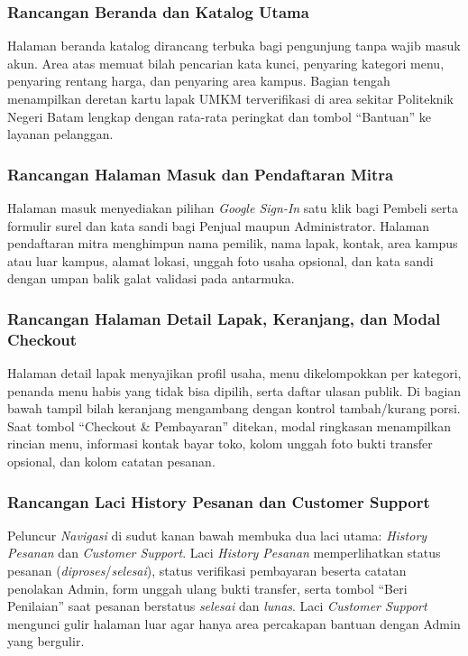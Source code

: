 \subsubsection{Rancangan Beranda dan Katalog Utama}
Halaman beranda katalog dirancang terbuka bagi pengunjung tanpa wajib masuk akun. Area atas memuat bilah pencarian kata kunci, penyaring kategori menu, penyaring rentang harga, dan penyaring area kampus. Bagian tengah menampilkan deretan kartu lapak UMKM terverifikasi di area sekitar Politeknik Negeri Batam lengkap dengan rata-rata peringkat dan tombol ``Bantuan'' ke layanan pelanggan.

\subsubsection{Rancangan Halaman Masuk dan Pendaftaran Mitra}
Halaman masuk menyediakan pilihan \textit{Google Sign-In} satu klik bagi Pembeli serta formulir surel dan kata sandi bagi Penjual maupun Administrator. Halaman pendaftaran mitra menghimpun nama pemilik, nama lapak, kontak, area kampus atau luar kampus, alamat lokasi, unggah foto usaha opsional, dan kata sandi dengan umpan balik galat validasi pada antarmuka.

\subsubsection{Rancangan Halaman Detail Lapak, Keranjang, dan Modal Checkout}
Halaman detail lapak menyajikan profil usaha, menu dikelompokkan per kategori, penanda menu habis yang tidak bisa dipilih, serta daftar ulasan publik. Di bagian bawah tampil bilah keranjang mengambang dengan kontrol tambah/kurang porsi. Saat tombol ``Checkout \& Pembayaran'' ditekan, modal ringkasan menampilkan rincian menu, informasi kontak bayar toko, kolom unggah foto bukti transfer opsional, dan kolom catatan pesanan.

\subsubsection{Rancangan Laci History Pesanan dan Customer Support}
Peluncur \textit{Navigasi} di sudut kanan bawah membuka dua laci utama: \textit{History Pesanan} dan \textit{Customer Support}. Laci \textit{History Pesanan} memperlihatkan status pesanan (\textit{diproses}/\textit{selesai}), status verifikasi pembayaran beserta catatan penolakan Admin, form unggah ulang bukti transfer, serta tombol ``Beri Penilaian'' saat pesanan berstatus \textit{selesai} dan \textit{lunas}. Laci \textit{Customer Support} mengunci gulir halaman luar agar hanya area percakapan bantuan dengan Admin yang bergulir.

